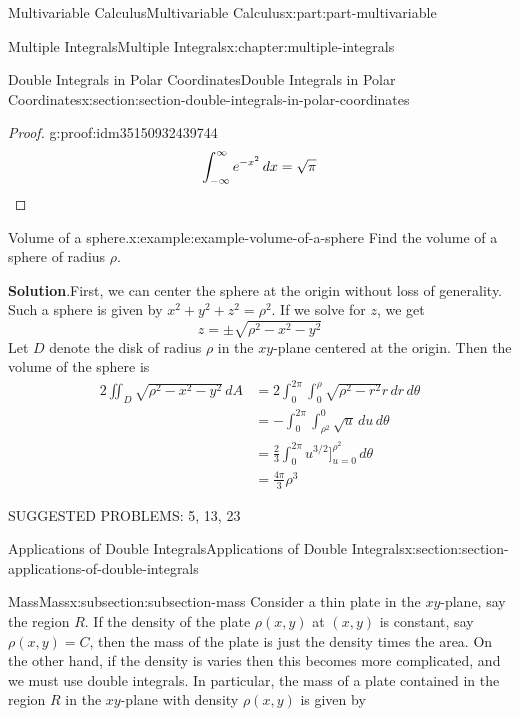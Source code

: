 \documentclass[twoside,10pt,]{book}
\newcommand{\blocktitlefont}{\relax}
\numberwithin{equation}{part}
\newcommand{\qedhere}{\relax}
\begin{document}
\begin{partptx}{Multivariable Calculus}{}{Multivariable Calculus}{}{}{x:part:part-multivariable}
\begin{chapterptx}{Multiple Integrals}{}{Multiple Integrals}{}{}{x:chapter:multiple-integrals}
\begin{sectionptx}{Double Integrals in Polar Coordinates}{}{Double Integrals in Polar Coordinates}{}{}{x:section:section-double-integrals-in-polar-coordinates}
\begin{proof}{}{g:proof:idm35150932439744}
\begin{equation*}
\int_{-\infty}^{\infty}e^{-x^{2}}\,dx = \sqrt{\pi}\qedhere
\end{equation*}
%
\end{proof}
\begin{example}{Volume of a sphere.}{x:example:example-volume-of-a-sphere}%
Find the volume of a sphere of radius \(\rho\).%
\par\smallskip%
\noindent\textbf{\blocktitlefont Solution}.\hypertarget{g:solution:idm35150932385728}{}\quad{}First, we can center the sphere at the origin without loss of generality. Such a sphere is given by \(x^{2} + y^{2} + z^{2} = \rho^{2}\). If we solve for \(z\), we get%
\begin{equation*}
z = \pm\sqrt{\rho^{2} - x^{2} - y^{2}}
\end{equation*}
Let \(D\) denote the disk of radius \(\rho\) in the \(xy\)-plane centered at the origin. Then the volume of the sphere is%
\begin{align*}
2\iint_{D}\sqrt{\rho^{2} - x^{2} - y^{2}}\,dA & = 2\int_{0}^{2\pi}\int_{0}^{\rho}\sqrt{\rho^{2} - r^{2}}r\,dr\,d\theta \\
& = -\int_{0}^{2\pi}\int_{\rho^{2}}^{0}\sqrt{u}\,du\,d\theta \\
& = \frac{2}{3}\int_{0}^{2\pi}u^{3/2}\bigg]_{u=0}^{\rho^{2}}\,d\theta \\
& = \frac{4\pi}{3}\rho^{3} 
\end{align*}
%
\end{example}
SUGGESTED PROBLEMS: 5, 13, 23%
\end{sectionptx}
%
%
\typeout{************************************************}
\typeout{************************************************}
%
\begin{sectionptx}{Applications of Double Integrals}{}{Applications of Double Integrals}{}{}{x:section:section-applications-of-double-integrals}
%
%
\typeout{************************************************}
\typeout{************************************************}
%
\begin{subsectionptx}{Mass}{}{Mass}{}{}{x:subsection:subsection-mass}
Consider a thin plate in the \(xy\)-plane, say the region \(R\). If the density of the plate \(\rho(x,y)\) at \((x,y)\) is constant, say \(\rho(x,y) = C\), then the mass of the plate is just the density times the area. On the other hand, if the density is varies then this becomes more complicated, and we must use double integrals. In particular, the mass of a plate contained in the region \(R\) in the \(xy\)-plane with density \(\rho(x,y)\) is given by%

\end{subsectionptx}
\end{sectionptx}
\end{chapterptx}
\end{partptx}
\end{document}
